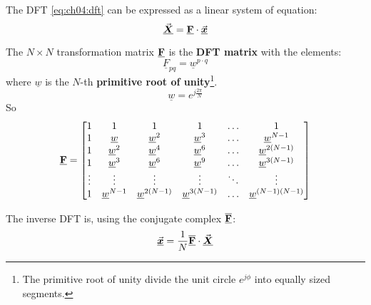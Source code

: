 \begin{refsection}
The \ac{DFT} \eqref{eq:ch04:dft} can be expressed as a linear system of equation:
\begin{equation}
	\vec{\bm{\underline{X}}} = \underline{\bm{\mathrm{F}}} \cdot \vec{\bm{\underline{x}}}
\end{equation}

The $N \times N$ transformation matrix $\underline{\bm{\mathrm{F}}}$ is the  \textbf{\ac{DFT} matrix} with the elements:
\begin{equation}
	\underline{F}_{pq} = \underline{w}^{p \cdot q}
\end{equation}
where $\underline{w}$ is the $N$-th  \textbf{primitive root of unity}\footnote{The primitive root of unity divide the unit circle $e^{j \phi}$ into equally sized segments.}.
\begin{equation}
	\underline{w} = e^{j \frac{2 \pi}{N}}
\end{equation}
So
\begin{equation}
	\underline{\bm{\mathrm{F}}} = \left[
	\begin{matrix}
		1 & 1 & 1 & 1 & \ldots & 1 \\
		1 & \underline{w} & \underline{w}^2 & \underline{w}^3 & \ldots & \underline{w}^{N-1} \\
		1 & \underline{w}^2 & \underline{w}^4 & \underline{w}^6 & \ldots & \underline{w}^{2\left(N-1\right)} \\
		1 & \underline{w}^3 & \underline{w}^6 & \underline{w}^9 & \ldots & \underline{w}^{3\left(N-1\right)} \\
		\vdots & \vdots & \vdots & \vdots & \ddots & \vdots \\
		1 & \underline{w}^{N-1} & \underline{w}^{2\left(N-1\right)} & \underline{w}^{3\left(N-1\right)} & \ldots & \underline{w}^{\left(N-1\right)\left(N-1\right)} \\
	\end{matrix}
	\right]
\end{equation}

The inverse \ac{DFT} is, using the conjugate complex $\overline{\underline{\bm{\mathrm{F}}}}$:
\begin{equation}
	\vec{\bm{\underline{x}}} = \frac{1}{N} \overline{\underline{\bm{\mathrm{F}}}} \cdot \vec{\bm{\underline{X}}}
\end{equation}


\end{refsection}
